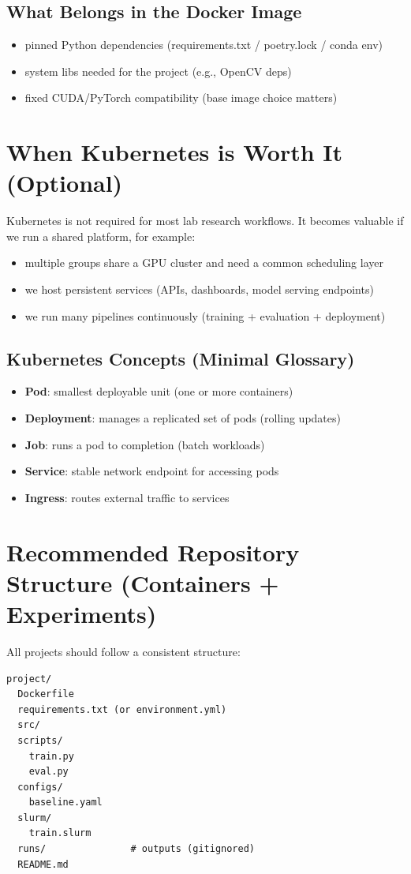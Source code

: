 \documentclass[11pt]{article}
\begin{document}
\subsection{What Belongs in the Docker Image}
\begin{itemize}
  \item pinned Python dependencies (requirements.txt / poetry.lock / conda env)
  \item system libs needed for the project (e.g., OpenCV deps)
  \item fixed CUDA/PyTorch compatibility (base image choice matters)
\end{itemize}

\section{When Kubernetes is Worth It (Optional)}
Kubernetes is not required for most lab research workflows. It becomes valuable if we run a shared platform, for example:
\begin{itemize}
  \item multiple groups share a GPU cluster and need a common scheduling layer
  \item we host persistent services (APIs, dashboards, model serving endpoints)
  \item we run many pipelines continuously (training + evaluation + deployment)
\end{itemize}

\subsection{Kubernetes Concepts (Minimal Glossary)}
\begin{itemize}
  \item \textbf{Pod}: smallest deployable unit (one or more containers)
  \item \textbf{Deployment}: manages a replicated set of pods (rolling updates)
  \item \textbf{Job}: runs a pod to completion (batch workloads)
  \item \textbf{Service}: stable network endpoint for accessing pods
  \item \textbf{Ingress}: routes external traffic to services
\end{itemize}

\section{Recommended Repository Structure (Containers + Experiments)}
All projects should follow a consistent structure:
\begin{lstlisting}
project/
  Dockerfile
  requirements.txt (or environment.yml)
  src/
  scripts/
    train.py
    eval.py
  configs/
    baseline.yaml
  slurm/
    train.slurm
  runs/               # outputs (gitignored)
  README.md
\end{lstlisting}
\end{document}

